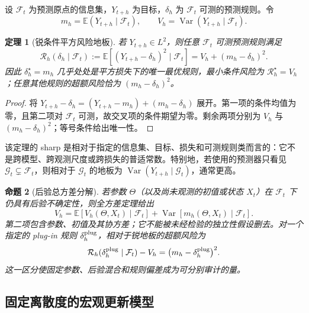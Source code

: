 \documentclass[11pt,a4paper]{article}
\newtheorem{theorem}{定理}
\newtheorem{proposition}[theorem]{命题}
\begin{document}
设 $\mathcal F_t$ 为预测原点的信息集，$Y_{t+h}$ 为目标，$\delta_h$ 为 $\mathcal F_t$ 可测的预测规则。令
\begin{equation}
m_h=\mathbb E(Y_{t+h}\mid\mathcal F_t),\qquad V_h=\operatorname{Var}(Y_{t+h}\mid\mathcal F_t).
\end{equation}
\begin{theorem}[锐条件平方风险地板]\label{thm:sharp_floor}
若 $Y_{t+h}\in L^2$，则任意 $\mathcal F_t$ 可测预测规则满足
\begin{equation}
\mathcal R_h(\delta_h\mid\mathcal F_t)
:=\mathbb E[(Y_{t+h}-\delta_h)^2\mid\mathcal F_t]
=V_h+(m_h-\delta_h)^2.\label{eq:identity}
\end{equation}
因此 $\delta_h^\star=m_h$ 几乎处处是平方损失下的唯一最优规则，最小条件风险为 $\mathcal R_h^\star=V_h$；任意其他规则的超额风险恰为 $(m_h-\delta_h)^2$。
\end{theorem}
\begin{proof}
将 $Y_{t+h}-\delta_h=(Y_{t+h}-m_h)+(m_h-\delta_h)$ 展开。第一项的条件均值为零，且第二项对 $\mathcal F_t$ 可测，故交叉项的条件期望为零。剩余两项分别为 $V_h$ 与 $(m_h-\delta_h)^2$；等号条件给出唯一性。
\end{proof}

该定理的 sharp 是相对于指定的信息集、目标、损失和可测规则类而言的：它不是跨模型、跨观测尺度或跨损失的普适常数。特别地，若使用的预测器只看见 $\mathcal G_t\subsetneq\mathcal F_t$，则相对于 $\mathcal G_t$ 的地板为 $\operatorname{Var}(Y_{t+h}\mid\mathcal G_t)$，通常更高。

\begin{proposition}[后验总方差分解]\label{prop:posterior_variance}
若参数 $\Theta$（以及尚未观测的初值或状态 $X_t$）在 $\mathcal F_t$ 下仍具有后验不确定性，则全方差定理给出
\begin{equation}
V_h=\mathbb E\!\left[V_h(\Theta,X_t)\mid\mathcal F_t\right]
+\operatorname{Var}\!\left[m_h(\Theta,X_t)\mid\mathcal F_t\right].\label{eq:posterior}
\end{equation}
第二项包含参数、初值及其协方差；它不能被未经检验的独立性假设删去。对一个指定的 plug-in 规则 $\delta_h^{\rm plug}$，相对于锐地板的超额风险为
\begin{equation}
\mathcal R_h(\delta_h^{\rm plug}\mid\mathcal F_t)-V_h
=\bigl(m_h-\delta_h^{\rm plug}\bigr)^2.\label{eq:plugin_excess}
\end{equation}
这一区分使固定参数、后验混合和规则偏差成为可分别审计的量。
\end{proposition}

\subsection{固定离散度的宏观更新模型}
\end{document}

